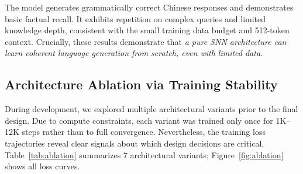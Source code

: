 \documentclass[10pt,twocolumn]{article}
\begin{document}
The model generates grammatically correct Chinese responses and demonstrates basic factual recall.
It exhibits repetition on complex queries and limited knowledge depth, consistent with the small training data budget and 512-token context.
Crucially, these results demonstrate that \emph{a pure SNN architecture can learn coherent language generation from scratch, even with limited data}.

\subsection{Architecture Ablation via Training Stability}
\label{sec:ablation}

During development, we explored multiple architectural variants prior to the final design.
Due to compute constraints, each variant was trained only once for 1K--12K steps rather than to full convergence.
Nevertheless, the training loss trajectories reveal clear signals about which design decisions are critical.
Table~\ref{tab:ablation} summarizes 7 architectural variants; Figure~\ref{fig:ablation} shows all loss curves.
\end{document}
